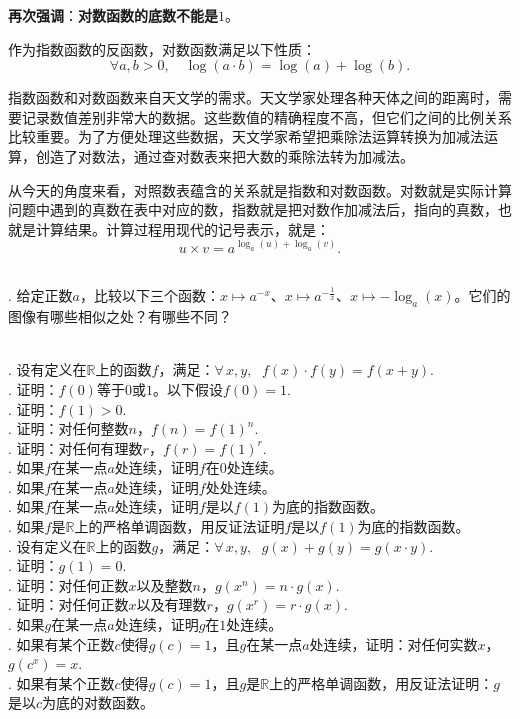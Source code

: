 \documentclass[12pt,UTF8]{ctexbook}
\begin{document}
\textbf{再次强调}：\textbf{对数函数的底数不能是}$1$。

作为指数函数的反函数，对数函数满足以下性质：
$$ \forall a, b > 0, \quad\log(a\cdot b) = \log(a) + \log(b). $$

指数函数和对数函数来自天文学的需求。天文学家处理各种天体之间的距离时，需要记录数值差别非常大的数据。这些数值的精确程度不高，但它们之间的比例关系比较重要。为了方便处理这些数据，天文学家希望把乘除法运算转换为加减法运算，创造了对数法，通过查对数表来把大数的乘除法转为加减法。

从今天的角度来看，对照数表蕴含的关系就是指数和对数函数。对数就是实际计算问题中遇到的真数在表中对应的数，指数就是把对数作加减法后，指向的真数，也就是计算结果。计算过程用现代的记号表示，就是：
$$ u \times v = a^{\log_a(u) + \log_a(v)}.$$

\begin{sk}
    \mbox{}\\
    . 给定正数$a$，比较以下三个函数：$x\mapsto a^{-x}$、$x\mapsto a^{-\frac{1}{x}}$、$x\mapsto -\log_a(x)$。它们的图像有哪些相似之处？有哪些不同？
\end{sk}

\begin{xt}
    \mbox{}\\
    . 设有定义在$\mathbb{R}$上的函数$f$，满足：$\forall \, x, y, \;\,\, f(x) \cdot f(y) = f(x + y).$\\
    . 证明：$f(0)$等于$0$或$1$。以下假设$f(0) = 1.$\\
    . 证明：$f(1) > 0.$\\
    . 证明：对任何整数$n$，$f(n) = f(1)^n.$\\
    . 证明：对任何有理数$r$，$f(r) = f(1)^r.$\\
    . 如果$f$在某一点$a$处连续，证明$f$在$0$处连续。\\
    . 如果$f$在某一点$a$处连续，证明$f$处处连续。\\
    . 如果$f$在某一点$a$处连续，证明$f$是以$f(1)$为底的指数函数。\\
    . 如果$f$是$\mathbb{R}$上的严格单调函数，用反证法证明$f$是以$f(1)$为底的指数函数。\\
    . 设有定义在$\mathbb{R}$上的函数$g$，满足：$\forall \, x, y, \;\,\, g(x) + g(y) = g(x \cdot y).$\\
    . 证明：$g(1) = 0.$\\
    . 证明：对任何正数$x$以及整数$n$，$g(x^n) = n\cdot g(x).$\\
    . 证明：对任何正数$x$以及有理数$r$，$g(x^r) = r\cdot g(x).$\\
    . 如果$g$在某一点$a$处连续，证明$g$在$1$处连续。\\
    . 如果有某个正数$c$使得$g(c) = 1$，且$g$在某一点$a$处连续，证明：对任何实数$x$，$g(c^x) = x.$\\
    . 如果有某个正数$c$使得$g(c) = 1$，且$g$是$\mathbb{R}$上的严格单调函数，用反证法证明：$g$是以$c$为底的对数函数。
\end{xt}
\end{document}
